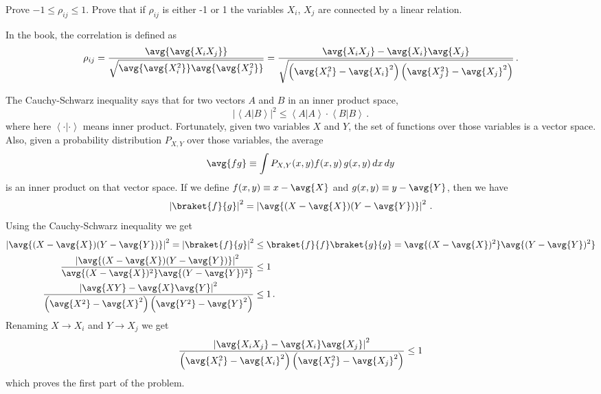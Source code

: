 

Prove $-1 \leq \rho_{ij} \leq 1$.
Prove that if $\rho_{ij}$ is either -1 or 1 the variables $X_i$, $X_j$ are connected by a linear relation.

In the book, the correlation is defined as
\begin{equation*}
\rho_{ij}
= \frac{\avg{\avg{X_i X_j}}}{\sqrt{\avg{\avg{X_i^2}} \avg{\avg{X_j^2}}}}
= \frac{\avg{X_i X_j}
- \avg{X_i}\avg{X_j}}{
\sqrt{\left(\avg{X_i^2} - \avg{X_i}^2 \right) \left( \avg{X_j^2} - \avg{X_j}^2 \right)}
} \, .
\end{equation*}


The Cauchy-Schwarz inequality says that for two vectors $A$ and $B$ in an inner product space,
\begin{equation*}
\left\lvert \left \langle A | B \right \rangle \right\vert ^2
\leq \left\langle A | A \right\rangle \cdot \left\langle B | B \right\rangle \, .
\end{equation*}
where here $\left \langle \cdot | \cdot \right \rangle$ means inner product.
Fortunately, given two variables $X$ and $Y$, the set of functions over those variables is a vector space.
Also, given a probability distribution $P_{X,Y}$ over those variables, the average \begin{equation*}
\avg{f g} \equiv \int P_{X,Y}(x, y) f(x, y) \, g(x, y) \, dx \, dy
\end{equation*}
is an inner product on that vector space.
If we define $f(x,y) \equiv x - \avg{X}$ and $g(x,y) \equiv y - \avg{Y}$, then we have
\begin{equation*}
\left \lvert \braket{f}{g} \right \rvert^2
= \left \lvert \avg{(X - \avg{X})(Y - \avg{Y})} \right \rvert^2 \, .
\end{equation*}
Using the Cauchy-Schwarz inequality we get
\begin{align*}
\left \lvert \avg{(X - \avg{X})(Y - \avg{Y})} \right \rvert^2
= \left \lvert \braket{f}{g} \right \rvert^2
&\leq \braket{f}{f} \braket{g}{g}
= \avg{(X - \avg{X})^2} \avg{(Y - \avg{Y})^2} \\
\frac{
\left \lvert \avg{(X - \avg{X})(Y - \avg{Y})} \right \rvert^2}
{
\avg{(X - \avg{X})^2} \avg{(Y - \avg{Y})^2}}
&\leq 1 \\
\frac{
\left \lvert \avg{XY} - \avg{X}\avg{Y} \right \rvert^2}
{
\left(\avg{X^2} - \avg{X}^2 \right) \left( \avg{Y^2} - \avg{Y}^2 \right)}
&\leq 1 \, .
\end{align*}
Renaming $X \rightarrow X_i$ and $Y \rightarrow X_j$ we get\
\begin{equation*}
\frac{
\left \lvert \avg{X_i X_j} - \avg{X_i}\avg{X_j} \right \rvert^2}
{
\left(\avg{X_i^2} - \avg{X_i}^2 \right) \left( \avg{X_j^2} - \avg{X_j}^2 \right)}
\leq 1
\end{equation*}
which proves the first part of the problem.

